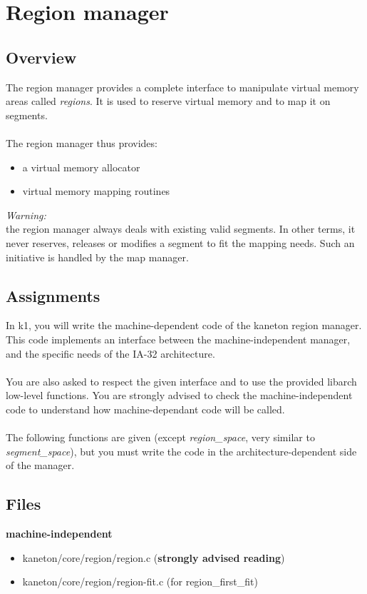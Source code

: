 %
%

\newpage

\section{Region manager}
\subsection*{Overview}
The region manager provides a complete interface to manipulate virtual memory
areas called {\em regions}. It is used to reserve virtual memory and to map it
on segments.\\
\\
The region manager thus provides:

\begin{itemize}
\item a virtual memory allocator
\item virtual memory mapping routines\\
\end{itemize}

{\em Warning:}\\
the region manager always deals with existing valid segments. In
other terms, it never reserves, releases or modifies a segment to fit the mapping
needs. Such an initiative is handled by the map manager.

\subsection*{Assignments}
In k1, you will write the machine-dependent code of the kaneton region manager.
This code implements an interface between the machine-independent manager, and
the specific needs of the IA-32 architecture.
\\ \\
You are also asked to respect the given interface and to use the provided
libarch low-level functions. You are strongly advised to check the machine-independent code to
understand how machine-dependant code will be called.
\\ \\
The following functions are given (except \emph{region\_space}, very similar to \emph{segment\_space}), but you must write the code in
the architecture-dependent side of the manager.

\subsection*{Files}
{\color{filerefcolor} \textbf{machine-independent}}
\begin{itemize}
\item kaneton/core/region/region.c (\textbf{strongly advised reading})
\item kaneton/core/region/region-fit.c (for region\_first\_fit)
\end{itemize}

